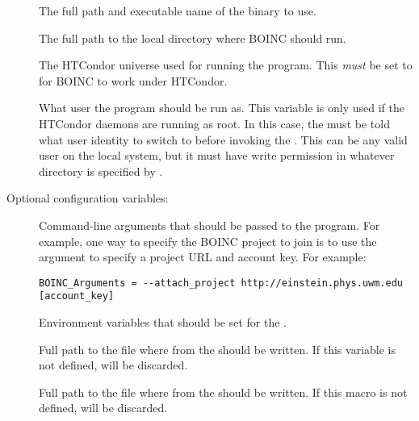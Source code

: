 \begin{description}

\item[] \label{param:BoincExecutable} The
  full path and executable name of the  binary to use.

\item[] \label{param:BoincInitialDir} The
  full path to the local directory where BOINC should run.

\item[] \label{param:BoincUniverse} The HTCondor
  universe used for running the  program.
  This \emph{must} be set to  for BOINC to work under
  HTCondor.

\item[] \label{param:BoincOwner} What user the
   program should be run as.
  This variable is only used if the HTCondor daemons are running as root.
  In this case, the  must be told what user identity
  to switch to before invoking the .
  This can be any valid user on the local system, but it must have
  write permission in whatever directory is specified by
  .

\end{description}

Optional configuration variables:

\begin{description}

\item[] \label{param:BoincArguments}
  Command-line arguments that should be passed to the
   program.
  For example, one way to specify the BOINC project to join is to use 
  the  argument to specify a project URL and
  account key.
  For example:

\footnotesize
\begin{verbatim}
BOINC_Arguments = --attach_project http://einstein.phys.uwm.edu [account_key] 
\end{verbatim}
\normalsize

\item[] \label{param:BoincEnvironment}
  Environment variables that should be set for the
  .

\item[] \label{param:BoincOutput} Full path to
  the file where  from the  should be
  written.
  If this variable is not defined,  will be discarded.

\item[] \label{param:BoincError} Full path to
  the file where  from the  should be
  written.
  If this macro is not defined,  will be discarded.

\end{description}


